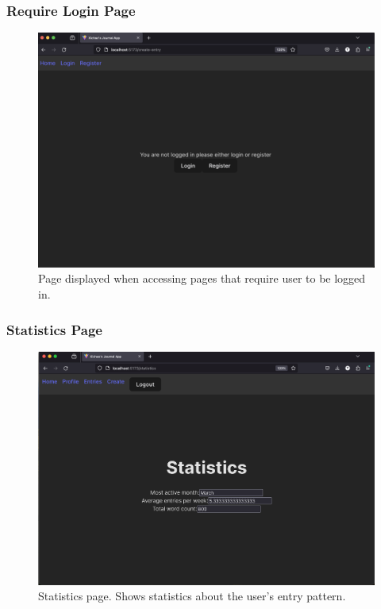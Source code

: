 \subsubsection{Require Login Page}
\begin{figure}[H]
\centering
\includegraphics[width=\linewidth]{Assets/UI-require-login-page.png}
\caption{Page displayed when accessing pages that require user to be logged in.}
\label{fig:uirequirelogin}
\end{figure}

\subsubsection{Statistics Page}
\begin{figure}[H]
\centering
\includegraphics[width=\linewidth]{Assets/UI-statistics.png}
\caption{Statistics page. Shows statistics about the user's entry pattern.}
\label{fig:uistatistics}
\end{figure}



